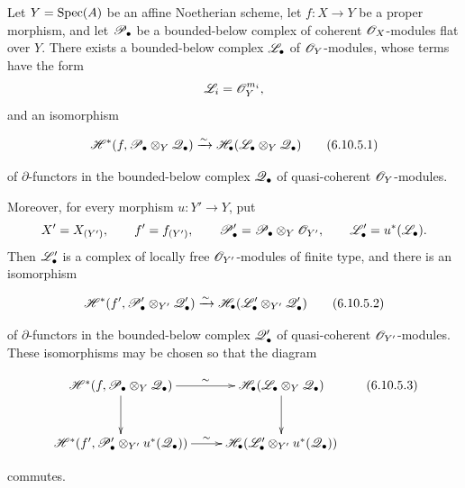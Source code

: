 \begin{theorem}[6.10.5]
\label{III.6.10.5}
Let $Y=\operatorname{Spec}(A)$ be an affine Noetherian scheme, let
$f:X\to Y$ be a proper morphism, and let $\mathscr{P}_\bullet$ be a
bounded-below complex of coherent $\mathscr{O}_X$-modules flat over
$Y$.  There exists a bounded-below complex $\mathscr{L}_\bullet$ of
$\mathscr{O}_Y$-modules, whose terms have the form
\[
  \mathscr{L}_i=\mathscr{O}_Y^{m_i},
\]
and an isomorphism
\begin{env}[6.10.5.1]
\label{III.6.10.5.1}
\[
  \sh H^*
  (f,\sh P_\bullet\otimes_Y\sh Q_\bullet)
  \xrightarrow{\sim}
  \sh H_\bullet
  (\sh L_\bullet\otimes_Y\sh Q_\bullet)
  \tag{6.10.5.1}\label{III.6.10.5.1.eq}
\]
\end{env}
of $\partial$-functors in the bounded-below complex
$\mathscr{Q}_\bullet$ of quasi-coherent $\mathscr{O}_Y$-modules.

Moreover, for every morphism $u:Y'\to Y$, put
\[
  X'=X_{(Y')},
  \qquad
  f'=f_{(Y')},
  \qquad
  \mathscr{P}_\bullet'
  =
  \mathscr{P}_\bullet\otimes_Y\mathscr{O}_{Y'},
  \qquad
  \mathscr{L}_\bullet'=u^*(\mathscr{L}_\bullet).
\]
Then $\mathscr{L}_\bullet'$ is a complex of locally free
$\mathscr{O}_{Y'}$-modules of finite type, and there is an isomorphism
\begin{env}[6.10.5.2]
\label{III.6.10.5.2}
\[
  \sh H^*
  (f',\sh P_\bullet'\otimes_{Y'}\sh Q_\bullet')
  \xrightarrow{\sim}
  \sh H_\bullet
  (\sh L_\bullet'\otimes_{Y'}\sh Q_\bullet')
  \tag{6.10.5.2}\label{III.6.10.5.2.eq}
\]
\end{env}
of $\partial$-functors in the bounded-below complex
$\mathscr{Q}_\bullet'$ of quasi-coherent $\mathscr{O}_{Y'}$-modules.  These
isomorphisms may be chosen so that the diagram
\begin{env}[6.10.5.3]
\label{III.6.10.5.3}
\[
\xymatrix@C=24pt@R=30pt{
  \sh H^*
  (f,\sh P_\bullet\otimes_Y\sh Q_\bullet)
  \ar[r]^-{\sim}\ar[d]
  &
  \sh H_\bullet
  (\sh L_\bullet\otimes_Y\sh Q_\bullet)
  \ar[d]
  \\
  \sh H^*
  (f',\sh P_\bullet'\otimes_{Y'}u^*(\sh Q_\bullet))
  \ar[r]^-{\sim}
  &
  \sh H_\bullet
  (\sh L_\bullet'\otimes_{Y'}u^*(\sh Q_\bullet))
}
\tag{6.10.5.3}\label{III.6.10.5.3.eq}
\]
\end{env}
commutes.
\end{theorem}

